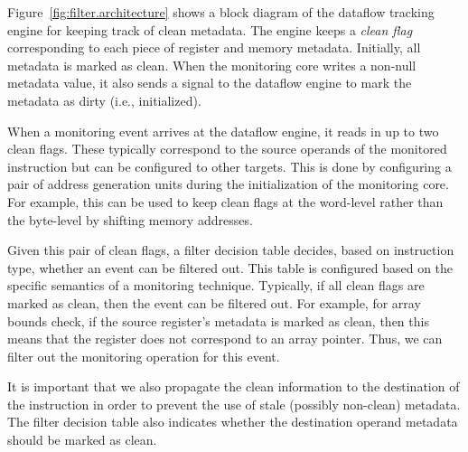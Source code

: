 Figure~\ref{fig:filter.architecture} shows a block diagram of the dataflow
tracking engine for
keeping track of clean metadata. The engine keeps a \emph{clean flag}
corresponding to each piece of register and memory metadata. Initially, all
metadata is marked as clean.
When the monitoring core writes a non-null metadata value, it also sends a
signal to the dataflow engine to mark the metadata as dirty (i.e., initialized). 

When a monitoring event arrives at the dataflow engine,
it reads in up to two clean flags. These typically correspond to the source
operands of the monitored instruction but can be configured to other targets. 
This is done by configuring a pair of address generation units during the
initialization of the monitoring core.
For example, this can be used to keep clean flags at the word-level rather than
the byte-level by shifting memory addresses.

Given this pair of clean flags, a filter decision table decides, based
on instruction type, whether an event can be filtered out. This table is
configured based on the specific semantics of a monitoring technique.
Typically, if all clean flags are marked as clean, then the
event can be filtered out. For example, for array bounds check, if the source
register's metadata is marked as clean, then this means that the
register does not correspond to an array pointer. Thus, we can filter out the
monitoring operation for this event. 

It is important that we also propagate the clean information to the destination
of the instruction in order to prevent the use of stale (possibly non-clean) metadata.
The filter decision table also indicates
whether the destination operand metadata should be marked as clean.

